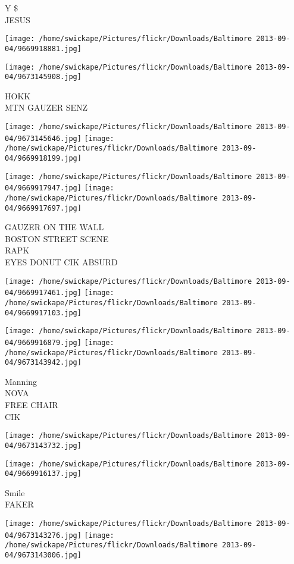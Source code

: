 \documentclass[10pt,letterpaper]{article}
\begin{document}
Y \$\\
JESUS
\pagebreak

\texttt{[image: /home/swickape/Pictures/flickr/Downloads/Baltimore 2013-09-04/9669918881.jpg]}

\vspace{0.25in}
\texttt{[image: /home/swickape/Pictures/flickr/Downloads/Baltimore 2013-09-04/9673145908.jpg]}

HOKK\\
MTN GAUZER SENZ
\pagebreak

\texttt{[image: /home/swickape/Pictures/flickr/Downloads/Baltimore 2013-09-04/9673145646.jpg]}
\texttt{[image: /home/swickape/Pictures/flickr/Downloads/Baltimore 2013-09-04/9669918199.jpg]}

\texttt{[image: /home/swickape/Pictures/flickr/Downloads/Baltimore 2013-09-04/9669917947.jpg]}
\texttt{[image: /home/swickape/Pictures/flickr/Downloads/Baltimore 2013-09-04/9669917697.jpg]}

GAUZER ON THE WALL\\
BOSTON STREET SCENE\\
RAPK\\
EYES DONUT CIK ABSURD
\pagebreak

\texttt{[image: /home/swickape/Pictures/flickr/Downloads/Baltimore 2013-09-04/9669917461.jpg]}
\texttt{[image: /home/swickape/Pictures/flickr/Downloads/Baltimore 2013-09-04/9669917103.jpg]}

\texttt{[image: /home/swickape/Pictures/flickr/Downloads/Baltimore 2013-09-04/9669916879.jpg]}
\texttt{[image: /home/swickape/Pictures/flickr/Downloads/Baltimore 2013-09-04/9673143942.jpg]}

Manning\\
NOVA\\
FREE CHAIR\\
CIK
\pagebreak

\texttt{[image: /home/swickape/Pictures/flickr/Downloads/Baltimore 2013-09-04/9673143732.jpg]}

\vspace{0.25in}
\texttt{[image: /home/swickape/Pictures/flickr/Downloads/Baltimore 2013-09-04/9669916137.jpg]}

Smile\\
FAKER
\pagebreak

\texttt{[image: /home/swickape/Pictures/flickr/Downloads/Baltimore 2013-09-04/9673143276.jpg]}
\texttt{[image: /home/swickape/Pictures/flickr/Downloads/Baltimore 2013-09-04/9673143006.jpg]}
\end{document}
